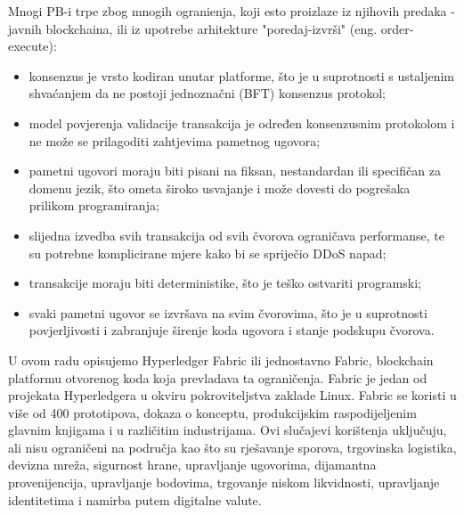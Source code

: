 \documentclass[times, utf8, diplomski]{fer}
\begin{document}
Mnogi PB-i trpe zbog mnogih ogranienja, koji esto proizlaze iz njihovih predaka - javnih blockchaina, ili iz upotrebe arhitekture "poredaj-izvrši" (eng. order-execute):

\begin{itemize}

\item konsenzus je vrsto kodiran unutar platforme, što je u suprotnosti s ustaljenim shvaćanjem da ne postoji jednoznačni (BFT) konsenzus protokol;

\item model povjerenja validacije transakcija je određen konsenzusnim protokolom i ne može se prilagoditi zahtjevima pametnog ugovora;

\item pametni ugovori moraju biti pisani na fiksan, nestandardan ili specifičan za domenu jezik, što ometa široko usvajanje i može dovesti do pogrešaka prilikom programiranja;

\item slijedna izvedba svih transakcija od svih čvorova ograničava performanse, te su potrebne komplicirane mjere kako bi se spriječio DDoS napad;

\item transakcije moraju biti deterministike, što je teško ostvariti programski;

\item svaki pametni ugovor se izvršava na svim čvorovima, što je u suprotnosti povjerljivosti i zabranjuje širenje koda ugovora i stanje podskupu čvorova.

\end{itemize}

U ovom radu opisujemo Hyperledger Fabric ili jednostavno Fabric, blockchain
platformu otvorenog koda koja prevladava ta ograničenja. Fabric je jedan od projekata Hyperledgera u okviru pokroviteljstva zaklade Linux. Fabric se koristi u više od 400 prototipova, dokaza o konceptu, produkcijskim raspodijeljenim glavnim knjigama i u različitim industrijama. Ovi slučajevi korištenja uključuju, ali nisu ograničeni na područja kao što su rješavanje sporova, trgovinska logistika, devizna mreža, sigurnost hrane, upravljanje ugovorima, dijamantna provenijencija, upravljanje bodovima, trgovanje niskom likvidnosti, upravljanje identitetima i namirba putem digitalne valute.
\end{document}

